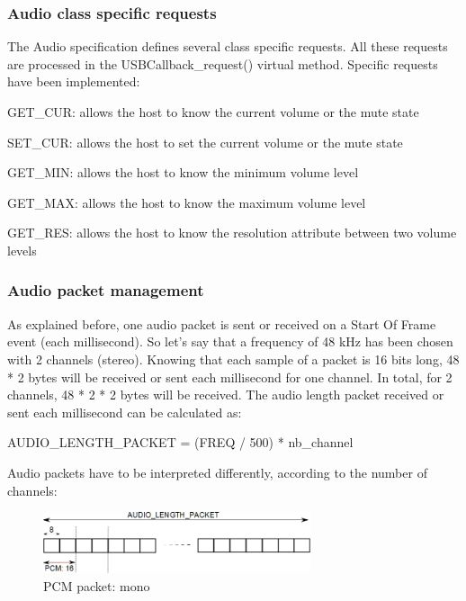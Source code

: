 \documentclass[pdftex,10pt,a4paper]{report}
\newenvironment{packed_item}{
\begin{itemize}
  \setlength{\itemsep}{1pt}
  \setlength{\parskip}{0pt}
  \setlength{\parsep}{0pt}
}{\end{itemize}}
\begin{document}
\subsubsection{Audio class specific requests}
The Audio specification defines several class specific requests. All these requests are processed in the USBCallback\_request() virtual method. Specific requests have been implemented:
\begin{packed_item}
	\item GET\_CUR: allows the host to know the current volume or the mute state
	\item SET\_CUR: allows the host to set the current volume or the mute state
	\item GET\_MIN: allows the host to know the minimum volume level
	\item GET\_MAX: allows the host to know the maximum volume level
	\item GET\_RES: allows the host to know the resolution attribute between two volume levels
\end{packed_item}

\subsubsection{Audio packet management}
As explained before, one audio packet is sent or received on a Start Of Frame event (each millisecond). So let's say that a frequency of 48 kHz has been chosen with 2 channels (stereo). Knowing that each sample of a packet is 16 bits long, 48 * 2 bytes will be received or sent each millisecond for one channel. In total, for 2 channels, 48 * 2 * 2 bytes will be received. The audio length packet received or sent each millisecond can be calculated as:
\begin{center}
	AUDIO\_LENGTH\_PACKET = (FREQ / 500) * nb\_channel
\end{center}

Audio packets have to be interpreted differently, according to the number of channels:

\begin{figure}[h!]
		\centering
		\includegraphics[width=0.7\textwidth]{./pcm.jpg}
		\caption{PCM packet: mono}
		\label{PCM packet: mono}
\end{figure}
\end{document}

